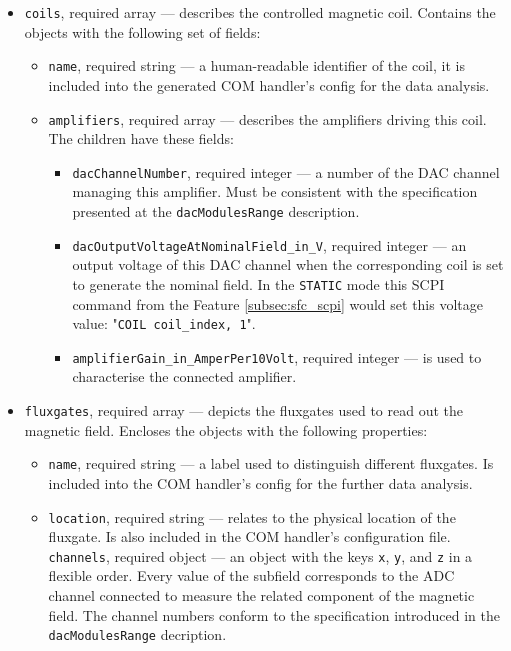 \begin{itemize}
	\item{
		\texttt{coils}, required array --- describes the controlled magnetic coil. Contains the objects with the following set of fields:
		\begin{itemize}
			\item \texttt{name}, required string --- a human-readable identifier of the coil, it is included into the generated COM handler's config for the data analysis.
			\item{
				\texttt{amplifiers}, required array --- describes the amplifiers driving this coil. The children have these fields:
				\begin{itemize}
					\item \texttt{dacChannelNumber}, required integer --- a number of the DAC channel managing this amplifier. Must be consistent with the specification presented at the \texttt{dacModulesRange} description.
					\item \texttt{dacOutputVoltageAtNominalField\_in\_V}, required integer --- an output voltage of this DAC channel when the corresponding coil is set to generate the nominal field. In the \texttt{STATIC} mode this SCPI command from the Feature \ref{subsec:sfc_scpi} would set this voltage value: "\texttt{COIL coil\_index, 1}".
					\item \texttt{amplifierGain\_in\_AmperPer10Volt}, required integer --- is used to characterise the connected amplifier.
				\end{itemize}
			}
		\end{itemize}
	}
	\item{
		\texttt{fluxgates}, required array --- depicts the fluxgates used to read out the magnetic field. Encloses the objects with the following properties:
		\begin{itemize}
			\item \texttt{name}, required string --- a label used to distinguish different fluxgates. Is included into the COM handler's config for the further data analysis.
			\item \texttt{location}, required string --- relates to the physical location of the fluxgate. Is also included in the COM handler's configuration file.
			\texttt{channels}, required object --- an object with the keys \texttt{x}, \texttt{y}, and \texttt{z} in a flexible order. Every value of the subfield corresponds to the ADC channel connected to measure the related component of the magnetic field. The channel numbers conform to the specification introduced in the \texttt{dacModulesRange} decription.
		\end{itemize}
	}
\end{itemize}

